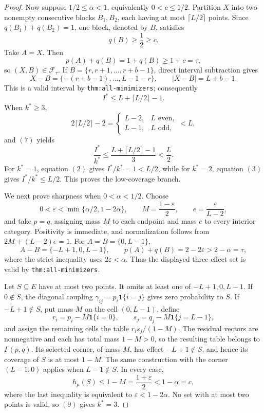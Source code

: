 \documentclass{article}
\begin{document}
\begin{proof}
Now suppose \(1/2\leq\alpha<1\), equivalently \(0<c\leq1/2\).  Partition \(X\) into two nonempty consecutive blocks \(B_1,B_2\), each having at most \(\lceil L/2\rceil\) points.  Since \(q(B_1)+q(B_2)=1\), one block, denoted by \(B\), satisfies
\[
q(B)\geq\frac12\geq c.
\tag{6}
\]
Take \(A=X\).  Then
\[
p(A)+q(B)=1+q(B)\geq1+c=\tau,
\]
so \((X,B)\in\mathcal F_{\tau}\).  If \(B=\{r,r+1,\ldots,r+b-1\}\), direct interval subtraction gives
\[
X-B=\{-(r+b-1),\ldots,L-1-r\},
\qquad
|X-B|=L+b-1.
\]
This is a valid interval by \texttt{thm:all-minimizers}; consequently
\[
I^*\leq L+\lceil L/2\rceil-1.
\tag{7}
\]
When \(k^*\geq3\),
\[
2\lceil L/2\rceil-2
=\begin{cases}
L-2,&L\text{ even},\\
L-1,&L\text{ odd},
\end{cases}
<L,
\]
and \((7)\) yields
\[
\frac{I^*}{k^*}
\leq\frac{L+\lceil L/2\rceil-1}{3}
<\frac L2.
\tag{8}
\]
For \(k^*=1\), equation \((2)\) gives \(I^*/k^*=1<L/2\), while for \(k^*=2\), equation \((3)\) gives \(I^*/k^*\leq L/2\).  This proves the low-coverage branch.

We next prove sharpness when \(0<\alpha<1/2\).  Choose
\[
0<\varepsilon<\min\{\alpha/2,1-2\alpha\},
\qquad
M=\frac{1-\varepsilon}{2},
\qquad
e=\frac{\varepsilon}{L-2},
\]
and take \(p=q\), assigning mass \(M\) to each endpoint and mass \(e\) to every interior category.  Positivity is immediate, and normalization follows from \(2M+(L-2)e=1\).  For \(A=B=\{0,L-1\}\),
\[
A-B=\{-L+1,0,L-1\},
\qquad
p(A)+q(B)=2-2\varepsilon>2-\alpha=\tau,
\tag{9}
\]
where the strict inequality uses \(2\varepsilon<\alpha\).  Thus the displayed three-effect set is valid by \texttt{thm:all-minimizers}.

Let \(S\subseteq E\) have at most two points.  It omits at least one of \(-L+1,0,L-1\).  If \(0\notin S\), the diagonal coupling \(\gamma_{ij}=p_i\mathbf 1\{i=j\}\) gives zero probability to \(S\).  If \(-L+1\notin S\), put mass \(M\) on the cell \((0,L-1)\), define
\[
r_i=p_i-M\mathbf 1\{i=0\},
\qquad
s_j=q_j-M\mathbf 1\{j=L-1\},
\]
and assign the remaining cells the table \(r_is_j/(1-M)\).  The residual vectors are nonnegative and each has total mass \(1-M>0\), so the resulting table belongs to \(\Gamma(p,q)\).  Its selected corner, of mass \(M\), has effect \(-L+1\notin S\), and hence its coverage of \(S\) is at most \(1-M\).  The same construction with the corner \((L-1,0)\) applies when \(L-1\notin S\).  In every case,
\[
h_{\mu}(S)\leq1-M=\frac{1+\varepsilon}{2}<1-\alpha=c,
\tag{10}
\]
where the last inequality is equivalent to \(\varepsilon<1-2\alpha\).  No set with at most two points is valid, so \((9)\) gives \(k^*=3\).


\end{proof}
\end{document}
